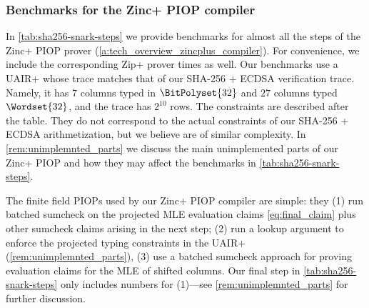 \subsubsection{Benchmarks for the Zinc+ PIOP compiler}
In \cref{tab:sha256-snark-steps} we provide benchmarks for almost all the steps of the Zinc+ PIOP prover (\cref{a:tech_overview_zincplus_compiler}). For convenience, we include the corresponding Zip+ prover times as well. Our benchmarks use a UAIR$+$ whose trace matches that of our SHA-256 + ECDSA verification trace. Namely, it has $7$ columns typed in $\BitPolyset{32}$ and $27$ columns typed $\Wordset{32}$, and the trace has $2^{10}$ rows. The constraints are described after the table. They do not correspond to the actual constraints of our SHA-256 + ECDSA arithmetization, but we believe are of similar complexity.  In \cref{rem:unimplemnted_parts} we discuss the main unimplemented parts of our Zinc+ PIOP and how they may affect the benchmarks in \cref{tab:sha256-snark-steps}.


The finite field PIOPs used by our Zinc$+$ PIOP compiler are simple: they (1) run batched sumcheck on the projected MLE evaluation claims  \eqref{eq:final_claim} plus other sumcheck claims arising in the next step; (2) run a lookup argument to enforce the projected typing constraints in the UAIR$+$ (\cref{rem:unimplemnted_parts}), (3) use a batched sumcheck approach for proving evaluation claims for the MLE of shifted columns. Our final step in \cref{tab:sha256-snark-steps} only includes numbers for (1)---see \cref{rem:unimplemnted_parts} for further discussion.

